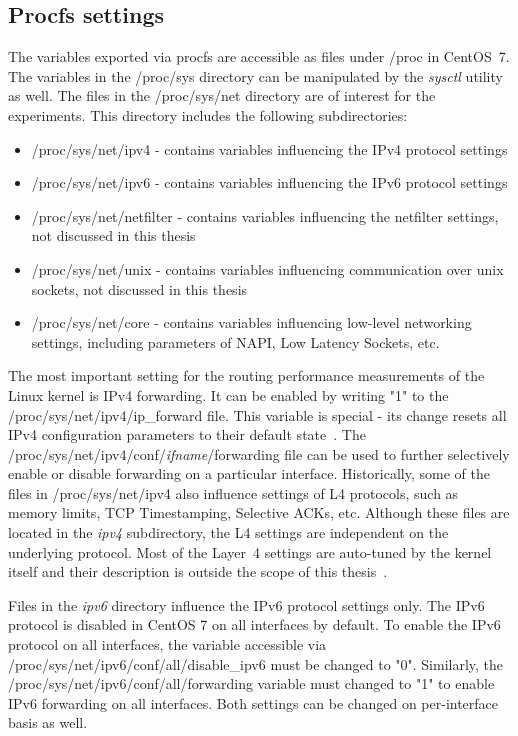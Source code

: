 
\subsection{Procfs settings}\label{sub:analysis-settings-procfs}
The variables exported via procfs are accessible as files under /proc in CentOS~7.
The variables in the /proc/sys directory can be manipulated by the {\it{sysctl}} utility as well.
The files in the /proc/sys/net directory are of interest for the experiments.
This directory includes the following subdirectories:
\begin{itemize}
\item /proc/sys/net/ipv4 - contains variables influencing the IPv4 protocol settings
\item /proc/sys/net/ipv6 - contains variables influencing the IPv6 protocol settings
\item /proc/sys/net/netfilter - contains variables influencing the netfilter settings, not discussed in this thesis
\item /proc/sys/net/unix - contains variables influencing communication over unix sockets, not discussed in this thesis
\item /proc/sys/net/core - contains variables influencing low-level networking settings, including parameters of NAPI, Low Latency Sockets, etc.
\end{itemize}

The most important setting for the routing performance measurements of the Linux kernel is IPv4 forwarding.
It can be enabled by writing "1" to the /proc/sys/net/ipv4/ip\_forward file.
This variable is special - its change resets all IPv4 configuration parameters to their default state~\cite{kernel-doc-ip-sysctl}.
The /proc/sys/net/ipv4/conf/{\it{ifname}}/forwarding file can be used
to further selectively enable or disable forwarding on a particular interface.
Historically, some of the files in /proc/sys/net/ipv4 also influence settings of L4 protocols,
such as memory limits, TCP Timestamping, Selective ACKs, etc.
Although these files are located in the {\it{ipv4}} subdirectory, the L4 settings are independent on the underlying protocol.
Most of the Layer~4 settings are auto-tuned by the kernel itself and
their description is outside the scope of this thesis~\cite{linux-kernel-networking}.

Files in the {\it{ipv6}} directory influence the IPv6 protocol settings only.
The IPv6 protocol is disabled in CentOS 7 on all interfaces by default.
To enable the IPv6 protocol on all interfaces,
the variable accessible via /proc/sys/net/ipv6/conf/all/disable\_ipv6 must be changed to "0".
Similarly, the /proc/sys/net/ipv6/conf/all/forwarding variable must changed to "1" to enable IPv6 forwarding on all interfaces.
Both settings can be changed on per-interface basis as well.

